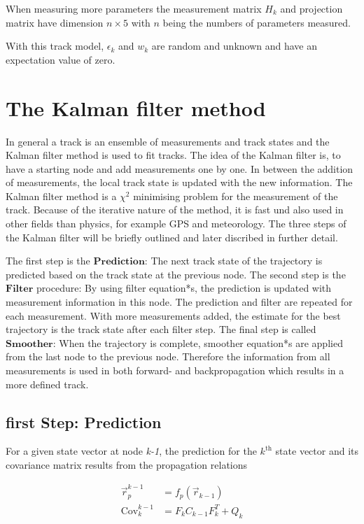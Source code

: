 When measuring more parameters the measurement matrix $H_k$ and projection matrix have dimension $n\times5$ with $n$ being the numbers of parameters measured.

With this track model, $\epsilon_k$ and $w_k$ are random and unknown and have an expectation value of zero.

\section{The Kalman filter method \cite{VanTilburg}}
In general a track is an ensemble of measurements and track states and the Kalman filter method is used to fit tracks.
The idea of the Kalman filter is, to have a starting node and add measurements one by one. In between the addition of measurements, the local track state is updated with the new information.
The Kalman filter method is a $\chi^2$ minimising problem for the measurement of the track. Because of the iterative nature of the method, it is fast und also used in other fields than physics, for example GPS and meteorology.
The three steps of the Kalman filter will be briefly outlined and later discribed in further detail.


The first step is the $\symbf{Prediction}$: The next track state of the trajectory is predicted based on the track state at the previous node.
The second step is the $\symbf{Filter}$ procedure: By using filter equation*s, the prediction is updated with measurement information in this node. The prediction and filter are repeated for each measurement. With more measurements added, the estimate for the best trajectory is the track state after each filter step.
The final step is called $\symbf{Smoother}$: When the trajectory is complete, smoother equation*s are applied from the last node to the previous node. Therefore the information from all measurements is used in both forward- and backpropagation which results in a more
defined track.

\subsection{first Step: Prediction}
For a given state vector at node \textit{k-1}, the prediction for the $k^{\text{th}}$ state vector and its covariance matrix results from the propagation relations

\begin{align*}
  \vec{r}_p^{k-1} &= f_p\left( \vec{r}_{k-1} \right) \\
  \text{Cov}_k^{k-1} &= F_k C_{k-1} F_k^T + Q_k
\end{align*}

